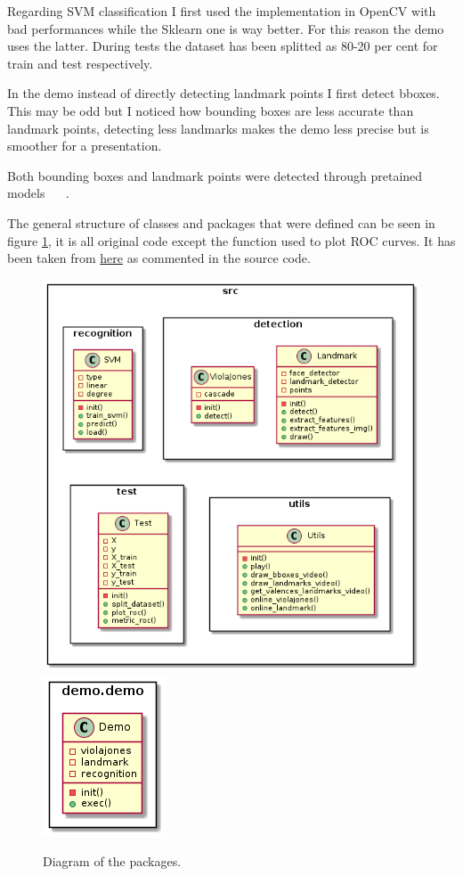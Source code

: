 Regarding SVM classification I first used the implementation in OpenCV with bad performances while the Sklearn one is way better. For this reason the demo uses the latter. 
During tests the dataset has been splitted as 80-20 per cent for train and test respectively.  

In the demo instead of directly detecting landmark points I first detect bboxes. 
This may be odd but I noticed how bounding boxes are less accurate than landmark points, detecting less landmarks makes the demo less precise but is smoother for a presentation. 

Both bounding boxes and landmark points were detected through pretained models ~\cite{dataset:haar} ~\cite{dataset:landmark}.

The general structure of classes and packages that were defined can be seen in figure \ref{fig:packages_diagram}, it is all original code except the function  used to plot ROC curves. It has been taken from \href{https://www.codespeedy.com/how-to-plot-roc-curve-using-sklearn-library-in-python/}{here} as commented in the source code.

\begin{figure}
    \centering
    \includegraphics[scale=0.55]{../../diagrams/out/src/classes.png}
    \includegraphics[scale=0.55]{../../diagrams/out/demo/classes.png}
    \caption{Diagram of the packages.}
    \label{fig:packages_diagram}
\end{figure}

